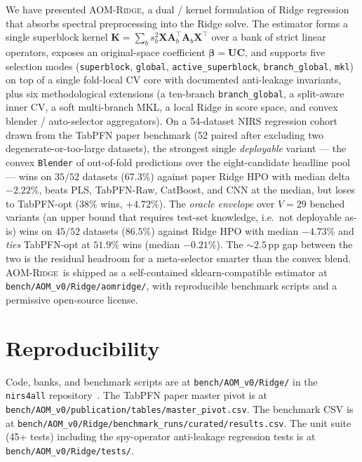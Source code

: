 \documentclass[11pt,a4paper]{article}
\newcommand{\Xmat}{\mathbf{X}}
\newcommand{\Amat}{\mathbf{A}}
\newcommand{\Kmat}{\mathbf{K}}
\newcommand{\Umat}{\mathbf{U}}
\newcommand{\Cmat}{\mathbf{C}}
\newcommand{\AOMR}{\textsc{AOM-Ridge}\xspace}
\newcommand{\nirsfourall}{\texttt{nirs4all}\xspace}
\begin{document}
We have presented \AOMR, a dual / kernel formulation of Ridge
regression that absorbs spectral preprocessing into the Ridge solve.
The estimator forms a single superblock kernel
$\Kmat=\sum_b s_b^2\Xmat\Amat_b^\top\Amat_b\Xmat^\top$ over a bank of
strict linear operators, exposes an original-space coefficient
$\bm\beta=\Umat\Cmat$, and supports five selection modes
(\texttt{superblock}, \texttt{global}, \texttt{active\_superblock},
\texttt{branch\_global}, \texttt{mkl}) on top of a single fold-local
CV core with documented anti-leakage invariants, plus six
methodological extensions (a ten-branch \texttt{branch\_global}, a
split-aware inner CV, a soft multi-branch MKL, a local Ridge in
score space, and convex blender / auto-selector aggregators). On a
54-dataset NIRS regression cohort drawn from the TabPFN paper
benchmark (52 paired after excluding two degenerate-or-too-large
datasets), the strongest single \emph{deployable} variant --- the
convex \texttt{Blender} of out-of-fold predictions over the
eight-candidate headline pool --- wins on $35/52$ datasets ($67.3\%$)
against paper Ridge HPO with median delta $-2.22\%$, beats PLS,
TabPFN-Raw, CatBoost, and CNN at the median, but loses to TabPFN-opt
($38\%$ wins, $+4.72\%$). The \emph{oracle envelope} over $V=29$
benched variants (an upper bound that requires test-set knowledge,
i.e.\ not deployable as-is) wins on $45/52$ datasets ($86.5\%$)
against Ridge HPO with median $-4.73\%$ and \emph{ties} TabPFN-opt at
$51.9\%$ wins (median $-0.21\%$). The $\sim 2.5$\,pp gap between the
two is the residual headroom for a meta-selector smarter than the
convex blend. \AOMR\ is shipped
as a self-contained sklearn-compatible estimator at
\texttt{bench/AOM\_v0/Ridge/aomridge/}, with reproducible benchmark
scripts and a permissive open-source license.

\section*{Reproducibility}

Code, banks, and benchmark scripts are at
\texttt{bench/AOM\_v0/Ridge/} in the \nirsfourall
repository~\citep{nirs4all2025}. The TabPFN paper master pivot is at
\texttt{bench/AOM\_v0/publication/tables/master\_pivot.csv}. The
benchmark CSV is at
\texttt{bench/AOM\_v0/Ridge/benchmark\_runs/curated/results.csv}. The
unit suite (45+ tests) including the spy-operator anti-leakage
regression tests is at \texttt{bench/AOM\_v0/Ridge/tests/}.




\end{document}
